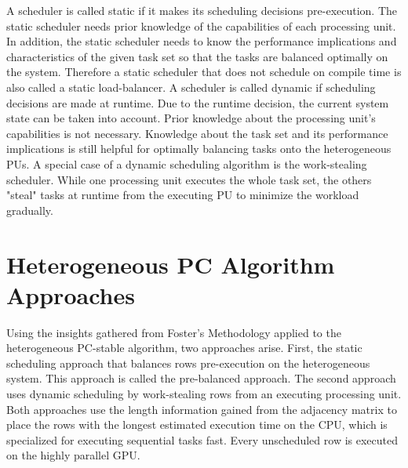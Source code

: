 A scheduler is called static if it makes its scheduling decisions pre-execution. The static scheduler needs prior knowledge of the capabilities of each processing unit. In addition, the static scheduler needs to know the performance implications and characteristics of the given task set so that the tasks are balanced optimally on the system. Therefore a static scheduler that does not schedule on compile time is also called a static load-balancer.
A scheduler is called dynamic if scheduling decisions are made at runtime. Due to the runtime decision, the current system state can be taken into account. Prior knowledge about the processing unit's capabilities is not necessary. Knowledge about the task set and its performance implications is still helpful for optimally balancing tasks onto the heterogeneous PUs.
A special case of a dynamic scheduling algorithm is the work-stealing scheduler. While one processing unit executes the whole task set, the others "steal" tasks at runtime from the executing PU to minimize the workload gradually.

\section{Heterogeneous PC Algorithm Approaches}
Using the insights gathered from Foster's Methodology applied to the heterogeneous PC-stable algorithm, two approaches arise. First, the static scheduling approach that balances rows pre-execution on the heterogeneous system. This approach is called the pre-balanced approach. The second approach uses dynamic scheduling by work-stealing rows from an executing processing unit. Both approaches use the length information gained from the adjacency matrix to place the rows with the longest estimated execution time on the CPU, which is specialized for executing sequential tasks fast. Every unscheduled row is executed on the highly parallel GPU.

